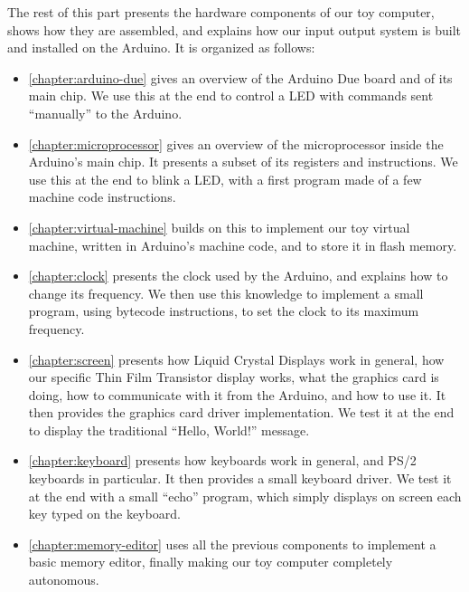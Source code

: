 The rest of this part presents the hardware components of our toy computer,
shows how they are assembled, and explains how our input output system is built
and installed on the Arduino. It is organized as follows:
\begin{itemize}
  \item \cref{chapter:arduino-due} gives an overview of the Arduino Due board
  and of its main chip. We use this at the end to control a LED with commands
  sent ``manually'' to the Arduino.

  \item \cref{chapter:microprocessor} gives an overview of the microprocessor
  inside the Arduino's main chip. It presents a subset of its registers and
  instructions. We use this at the end to blink a LED, with a first program
  made of a few machine code instructions.

  \item \cref{chapter:virtual-machine} builds on this to implement our toy
  virtual machine, written in Arduino's machine code, and to store it in flash
  memory.

  \item \cref{chapter:clock} presents the clock used by the Arduino, and
  explains how to change its frequency. We then use this knowledge to implement
  a small program, using bytecode instructions, to set the clock to its maximum
  frequency.

  \item \cref{chapter:screen} presents how Liquid
  Crystal Displays work in general, how our specific Thin Film Transistor
  display works, what the graphics card is doing, how to communicate with it
  from the Arduino, and how to use it. It then provides the graphics card
  driver implementation. We test it at the end to display the traditional
  ``Hello, World!'' message.

  \item \cref{chapter:keyboard} presents how keyboards work in general, and
  PS/2 keyboards in particular. It then provides a small keyboard driver. We
  test it at the end with a small ``echo'' program, which simply displays on
  screen each key typed on the keyboard.

  \item \cref{chapter:memory-editor} uses all the previous components to
  implement a basic memory editor, finally making our toy computer completely
  autonomous.
\end{itemize}


